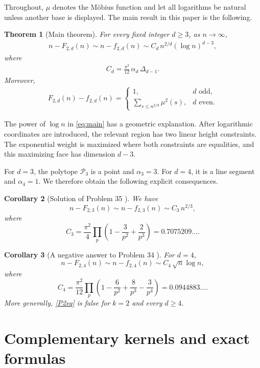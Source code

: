 \documentclass[10pt,a4paper]{amsart}
\numberwithin{equation}{section}
\newcommand{\cP}{\mathcal P}
\newcommand{\1}{\mathbf 1}
\newtheorem{theorem}{Theorem}[section]
\newtheorem{corollary}[theorem]{Corollary}
\begin{document}
Throughout, $\mu$ denotes the M\"obius function and let all logarithms be natural unless
another base is displayed. The main result in this paper is the following.

\begin{theorem}[Main theorem]\label{thm:main}
For every fixed integer $d\geq3$, as $n\to\infty$,
\begin{align}
 n-F_{2,d}(n)\sim n-f_{2,d}(n)
 \sim C_d\, n^{2/d}(\log n)^{d-3},
\label{eq:main}
\end{align}
where
\begin{align}
 C_d=\frac{\pi^2}{12}\,\alpha_d\,\Delta_{d-1}.
\label{eq:Cd}
\end{align}
Moreover,
\begin{align}
 F_{2,d}(n)-f_{2,d}(n)=
 \begin{cases}
 1,&d\text{ odd},\\[2mm]
 \displaystyle\sum_{s\leq n^{2/d}}\mu^2(s),&d\text{ even}.
 \end{cases}
\label{eq:exactdifference}
\end{align}
\end{theorem}

The power of $\log n$ in \eqref{eq:main} has a geometric explanation.
After logarithmic coordinates are introduced, the relevant region has
two linear height constraints.  The exponential weight is maximized
where both constraints are equalities, and this maximizing face has
dimension $d-3$.

For $d=3$, the polytope $\cP_3$ is a point and $\alpha_3=3$.
For $d=4$, it is a line segment and $\alpha_4=1$.  We therefore obtain
the following explicit consequences.

\begin{corollary}[Solution of Problem 35 \cite{FJKPS}]\label{cor:d3}
We have
\[
 n-F_{2,3}(n)\sim n-f_{2,3}(n)\sim C_3\,n^{2/3},
\]
where
\[
 C_3=\frac{\pi^2}{4}
 \prod_p\left(1-\frac3{p^2}+\frac2{p^3}\right)
 =0.7075209\ldots.
\]
\end{corollary}

\begin{corollary}[A negative answer to Problem 34 \cite{FJKPS}]\label{cor:d4}
For $d=4$,
\[
 n-F_{2,4}(n)\sim n-f_{2,4}(n)
 \sim C_4\,\sqrt n\log n,
\]
where
\[
 C_4=\frac{\pi^2}{12}
 \prod_p\left(1-\frac6{p^2}+\frac8{p^3}-\frac3{p^4}\right)
 =0.0944883\ldots.
\]
More generally, \eqref{P2eq} is false for $k=2$ and every
$d\geq4$.
\end{corollary}

\section{Complementary kernels and exact formulas}
\end{document}
